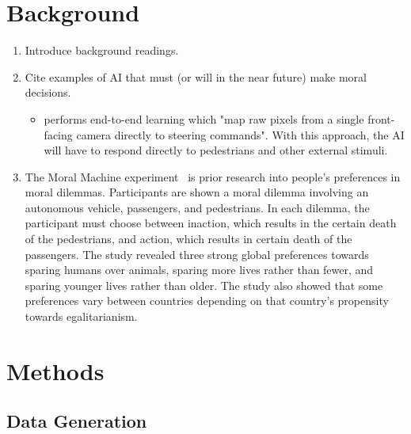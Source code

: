 \documentclass{report}
\begin{document}
\FloatBarrier
\chapter{Background}

\begin{enumerate}
    \item Introduce background readings.
    
    \item Cite examples of AI that must (or will in the near future) make moral decisions.
    \begin{itemize}
        \item \cite{bojarski2016end} performs end-to-end learning which "map raw pixels from a
        single front-facing camera directly to steering commands". With this approach, the AI will
        have to respond directly to pedestrians and other external stimuli.
    \end{itemize}
    
    \item The Moral Machine experiment~\cite{awad2018moral} is prior research into people's
    preferences in moral dilemmas. Participants are shown a moral dilemma involving an autonomous
    vehicle, passengers, and pedestrians. In each dilemma, the participant must choose between
    inaction, which results in the certain death of the pedestrians, and action, which results in
    certain death of the passengers. The study revealed three strong global preferences towards
    sparing humans over animals, sparing more lives rather than fewer, and sparing younger lives
    rather than older. The study also showed that some preferences vary between countries depending
    on that country's propensity towards egalitarianism.
\end{enumerate}

\FloatBarrier
\chapter{Methods}

\section{Data Generation}
\end{document}
